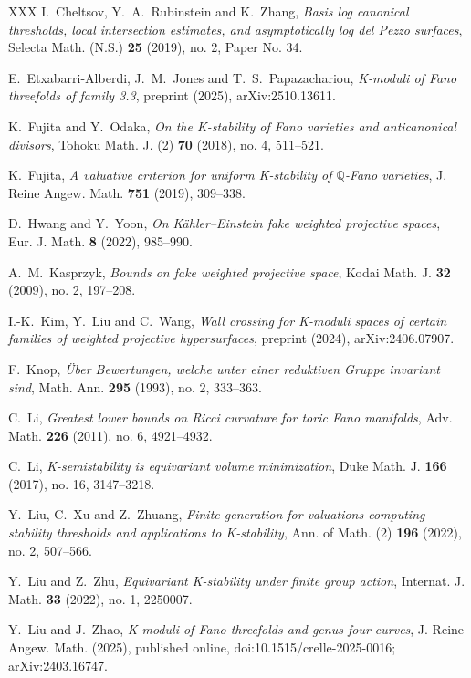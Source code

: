 \documentclass[11pt]{amsart}
\theoremstyle{definition}
\theoremstyle{remark}
\newcommand{\Q}{\mathbb{Q}}
\begin{document}
\begin{thebibliography}{XXX}
 I.~Cheltsov, Y.~A.~Rubinstein and K.~Zhang,
\emph{Basis log canonical thresholds, local intersection estimates, and
asymptotically log del Pezzo surfaces},
Selecta Math. (N.S.) \textbf{25} (2019), no. 2, Paper No. 34.

 E.~Etxabarri-Alberdi, J.~M.~Jones and
T.~S.~Papazachariou,
\emph{K-moduli of Fano threefolds of family 3.3},
preprint (2025), arXiv:2510.13611.

 K.~Fujita and Y.~Odaka,
\emph{On the K-stability of Fano varieties and anticanonical divisors},
Tohoku Math. J. (2) \textbf{70} (2018), no. 4, 511--521.

 K.~Fujita,
\emph{A valuative criterion for uniform K-stability of \(\Q\)-Fano
varieties}, J. Reine Angew. Math. \textbf{751} (2019), 309--338.

 D.~Hwang and Y.~Yoon,
\emph{On K\"ahler--Einstein fake weighted projective spaces},
Eur. J. Math. \textbf{8} (2022), 985--990.

 A.~M.~Kasprzyk,
\emph{Bounds on fake weighted projective space},
Kodai Math. J. \textbf{32} (2009), no. 2, 197--208.

 I.-K.~Kim, Y.~Liu and C.~Wang,
\emph{Wall crossing for K-moduli spaces of certain families of weighted
projective hypersurfaces}, preprint (2024), arXiv:2406.07907.

 F.~Knop,
\emph{\"Uber Bewertungen, welche unter einer reduktiven Gruppe invariant
sind}, Math. Ann. \textbf{295} (1993), no. 2, 333--363.

 C.~Li,
\emph{Greatest lower bounds on Ricci curvature for toric Fano manifolds},
Adv. Math. \textbf{226} (2011), no. 6, 4921--4932.

 C.~Li,
\emph{K-semistability is equivariant volume minimization},
Duke Math. J. \textbf{166} (2017), no. 16, 3147--3218.

 Y.~Liu, C.~Xu and Z.~Zhuang,
\emph{Finite generation for valuations computing stability thresholds and
applications to K-stability},
Ann. of Math. (2) \textbf{196} (2022), no. 2, 507--566.

 Y.~Liu and Z.~Zhu,
\emph{Equivariant K-stability under finite group action},
Internat. J. Math. \textbf{33} (2022), no. 1, 2250007.

 Y.~Liu and J.~Zhao,
\emph{K-moduli of Fano threefolds and genus four curves},
J. Reine Angew. Math. (2025), published online,
doi:10.1515/crelle-2025-0016; arXiv:2403.16747.


\end{thebibliography}
\end{document}
